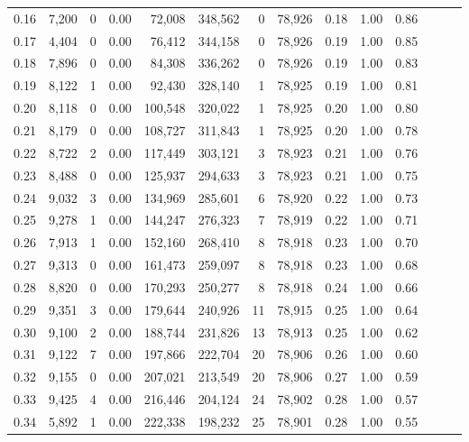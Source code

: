 \begin{tabular}{rrrrrrrrrrrrrr}
0.16 &  7,200 &      0 &  0.00 &   72,008 &  348,562 &       0 &  78,926 &  0.18 &  1.00 &      0.86 \\
0.17 &  4,404 &      0 &  0.00 &   76,412 &  344,158 &       0 &  78,926 &  0.19 &  1.00 &      0.85 \\
0.18 &  7,896 &      0 &  0.00 &   84,308 &  336,262 &       0 &  78,926 &  0.19 &  1.00 &      0.83 \\
0.19 &  8,122 &      1 &  0.00 &   92,430 &  328,140 &       1 &  78,925 &  0.19 &  1.00 &      0.81 \\
0.20 &  8,118 &      0 &  0.00 &  100,548 &  320,022 &       1 &  78,925 &  0.20 &  1.00 &      0.80 \\
0.21 &  8,179 &      0 &  0.00 &  108,727 &  311,843 &       1 &  78,925 &  0.20 &  1.00 &      0.78 \\
0.22 &  8,722 &      2 &  0.00 &  117,449 &  303,121 &       3 &  78,923 &  0.21 &  1.00 &      0.76 \\
0.23 &  8,488 &      0 &  0.00 &  125,937 &  294,633 &       3 &  78,923 &  0.21 &  1.00 &      0.75 \\
0.24 &  9,032 &      3 &  0.00 &  134,969 &  285,601 &       6 &  78,920 &  0.22 &  1.00 &      0.73 \\
0.25 &  9,278 &      1 &  0.00 &  144,247 &  276,323 &       7 &  78,919 &  0.22 &  1.00 &      0.71 \\
0.26 &  7,913 &      1 &  0.00 &  152,160 &  268,410 &       8 &  78,918 &  0.23 &  1.00 &      0.70 \\
0.27 &  9,313 &      0 &  0.00 &  161,473 &  259,097 &       8 &  78,918 &  0.23 &  1.00 &      0.68 \\
0.28 &  8,820 &      0 &  0.00 &  170,293 &  250,277 &       8 &  78,918 &  0.24 &  1.00 &      0.66 \\
0.29 &  9,351 &      3 &  0.00 &  179,644 &  240,926 &      11 &  78,915 &  0.25 &  1.00 &      0.64 \\
0.30 &  9,100 &      2 &  0.00 &  188,744 &  231,826 &      13 &  78,913 &  0.25 &  1.00 &      0.62 \\
0.31 &  9,122 &      7 &  0.00 &  197,866 &  222,704 &      20 &  78,906 &  0.26 &  1.00 &      0.60 \\
0.32 &  9,155 &      0 &  0.00 &  207,021 &  213,549 &      20 &  78,906 &  0.27 &  1.00 &      0.59 \\
0.33 &  9,425 &      4 &  0.00 &  216,446 &  204,124 &      24 &  78,902 &  0.28 &  1.00 &      0.57 \\
0.34 &  5,892 &      1 &  0.00 &  222,338 &  198,232 &      25 &  78,901 &  0.28 &  1.00 &      0.55 \\

\end{tabular}
